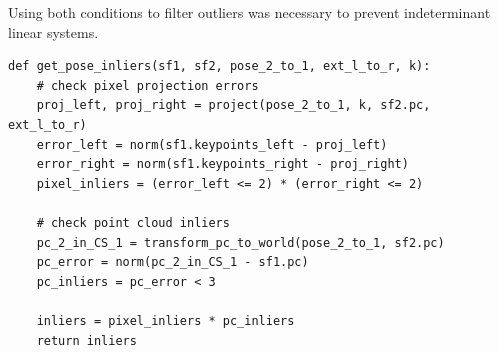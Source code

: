\documentclass[12pt]{article}
\begin{document}
Using both conditions to filter outliers was necessary to prevent indeterminant linear systems.
\begin{tcolorbox}
\begin{verbatim}  
def get_pose_inliers(sf1, sf2, pose_2_to_1, ext_l_to_r, k):
    # check pixel projection errors
    proj_left, proj_right = project(pose_2_to_1, k, sf2.pc, ext_l_to_r)
    error_left = norm(sf1.keypoints_left - proj_left)
    error_right = norm(sf1.keypoints_right - proj_right)
    pixel_inliers = (error_left <= 2) * (error_right <= 2)

    # check point cloud inliers
    pc_2_in_CS_1 = transform_pc_to_world(pose_2_to_1, sf2.pc)
    pc_error = norm(pc_2_in_CS_1 - sf1.pc)
    pc_inliers = pc_error < 3

    inliers = pixel_inliers * pc_inliers
    return inliers
\end{verbatim}
\end{tcolorbox}
\end{document}
